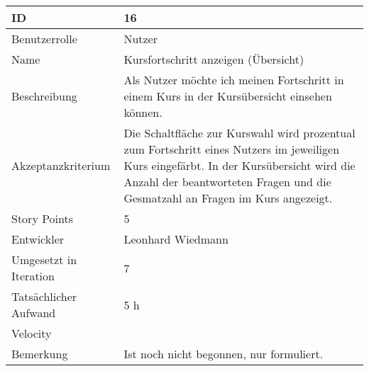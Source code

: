 \begin{tabularx}{\textwidth}{|p{}|X|}
	\hline
	ID & 16\\
	\hline
	Benutzerrolle & Nutzer\\
	\hline
	Name & Kursfortschritt anzeigen (Übersicht)\\
	\hline
	Beschreibung & Als Nutzer möchte ich meinen Fortschritt in einem Kurs in der Kursübersicht einsehen können.\\
	\hline
	Akzeptanzkriterium & Die Schaltfläche zur Kurswahl wird prozentual zum Fortschritt eines Nutzers im jeweiligen Kurs eingefärbt. In der Kursübersicht wird die Anzahl der beantworteten Fragen und die Gesmatzahl an Fragen im Kurs angezeigt.\\
	\hline
	Story Points & 5\\
	\hline
	Entwickler & Leonhard Wiedmann\\
	\hline
	Umgesetzt in Iteration & 7\\
	\hline
	Tatsächlicher Aufwand & 5 h\\
	\hline
	Velocity & \\
	\hline
	Bemerkung & Ist noch nicht begonnen, nur formuliert.\\
	\hline
\end{tabularx}
\vspace{20pt}
